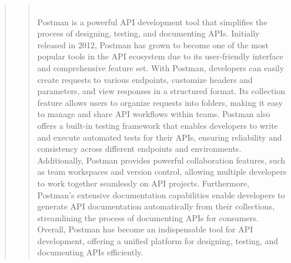 \documentclass[12pt]{report}
\begin{document}
\begin{quote}
\begin{quote}
\begin{figure}[h]
			\end{figure}
			\\Postman is a powerful API development tool that simplifies the process of designing, testing, and documenting APIs. Initially released in 2012, Postman has grown to become one of the most popular tools in the API ecosystem due to its user-friendly interface and comprehensive feature set. With Postman, developers can easily create requests to various endpoints, customize headers and parameters, and view responses in a structured format. Its collection feature allows users to organize requests into folders, making it easy to manage and share API workflows within teams. Postman also offers a built-in testing framework that enables developers to write and execute automated tests for their APIs, ensuring reliability and consistency across different endpoints and environments. Additionally, Postman provides powerful collaboration features, such as team workspaces and version control, allowing multiple developers to work together seamlessly on API projects. Furthermore, Postman's extensive documentation capabilities enable developers to generate API documentation automatically from their collections, streamlining the process of documenting APIs for consumers. Overall, Postman has become an indispensable tool for API development, offering a unified platform for designing, testing, and documenting APIs efficiently.
		\end{quote}
		\clearpage
		

\end{quote}
\end{document}
